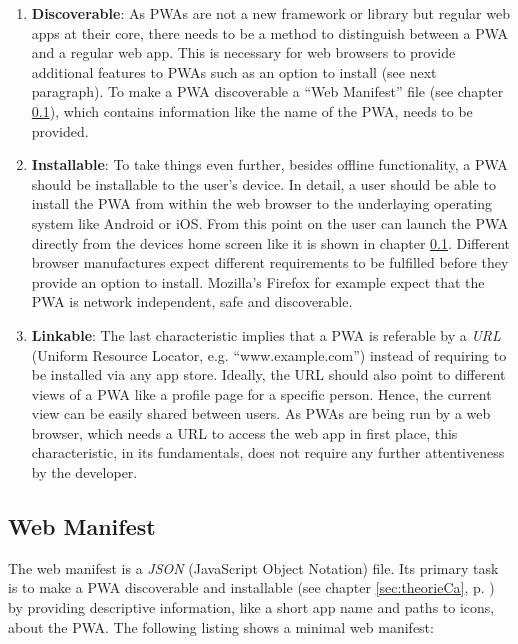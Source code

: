 \begin{enumerate}
	\item \textbf{Discoverable}: As PWAs are not a new framework or library but regular web apps at their core, there needs to be a method to distinguish between a PWA and a regular web app. This is necessary for web browsers to provide additional features to PWAs such as an option to install (see next paragraph). To make a PWA discoverable a “Web Manifest” file (see chapter \ref{sec:theorieCb}), which contains information like the name of the PWA, needs to be provided. \cite[p. 118]{liebelProgressiveWebApps2019}

	\item \textbf{Installable}: To take things even further, besides offline functionality, a PWA should be installable to the user’s device. In detail, a user should be able to install the PWA from within the web browser to the underlaying operating system like Android or iOS. From this point on the user can launch the PWA directly from the devices home screen like it is shown in chapter \ref{sec:theorieCb}. Different browser manufactures expect different requirements to be fulfilled before they provide an option to install. Mozilla’s Firefox for example expect that the PWA is network independent, safe and discoverable. \cite{HowMakePWAs}

	\item \textbf{Linkable}: The last characteristic implies that a PWA is referable by a \textit{URL} (Uniform Resource Locator, e.g. “www.example.com”) instead of requiring to be installed via any app store. Ideally, the URL should also point to different views of a PWA like a profile page for a specific person. Hence, the current view can be easily shared between users. As PWAs are being run by a web browser, which needs a URL to access the web app in first place, this characteristic, in its fundamentals, does not require any further attentiveness by the developer. \cite[pp. 126-127]{liebelProgressiveWebApps2019}
\end{enumerate}

\subsection{Web Manifest}
\label{sec:theorieCb}

The web manifest is a \textit{JSON} (JavaScript Object Notation) file. Its primary task is to make a PWA discoverable and installable (see chapter \ref{sec:theorieCa}, p. \pageref{sec:theorieCa}) by providing descriptive information, like a short app name and paths to icons, about the PWA. 
The following listing shows a minimal web manifest:

